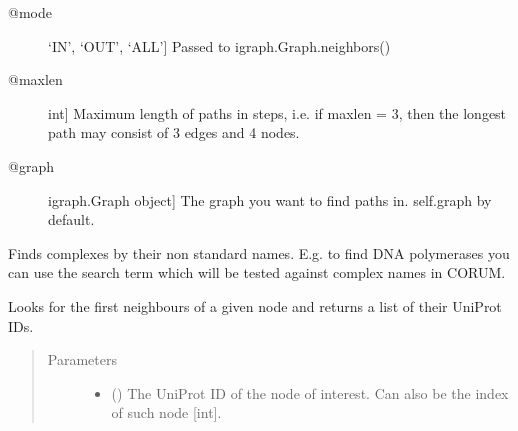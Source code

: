 \documentclass[letterpaper,10pt,english]{sphinxmanual}
\begin{document}
\begin{fulllineitems}
\begin{fulllineitems}
\begin{description}
\item[{@mode}] \leavevmode{[}‘IN’, ‘OUT’, ‘ALL’{]}
Passed to igraph.Graph.neighbors()

\item[{@maxlen}] \leavevmode{[}int{]}
Maximum length of paths in steps, i.e. if maxlen = 3, then
the longest path may consist of 3 edges and 4 nodes.

\item[{@graph}] \leavevmode{[}igraph.Graph object{]}
The graph you want to find paths in. self.graph by default.

\end{description}

\end{fulllineitems}


\begin{fulllineitems}
\label{\detokenize{main:pypath.main.PyPath.find_all_paths2}}
\end{fulllineitems}


\begin{fulllineitems}
\label{\detokenize{main:pypath.main.PyPath.find_complex}}
Finds complexes by their non standard names.
E.g. to find DNA polymerases you can use the search
term  which will be tested against complex names
in CORUM.

\end{fulllineitems}


\begin{fulllineitems}
\label{\detokenize{main:pypath.main.PyPath.first_neighbours}}
Looks for the first neighbours of a given node and returns a
list of their UniProt IDs.
\begin{quote}\begin{description}
\item[{Parameters}] \leavevmode\begin{itemize}
\item {} 
 () \textendash{} The UniProt ID of the node of interest. Can also be the
index of such node {[}int{]}.


\end{itemize}
\end{description}
\end{quote}
\end{fulllineitems}
\end{fulllineitems}
\end{document}

